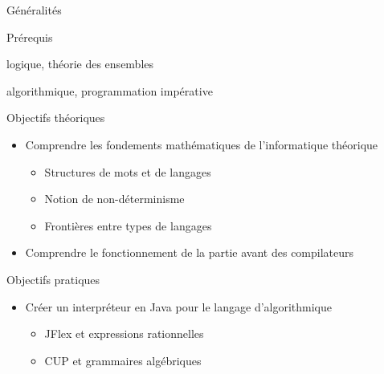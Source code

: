
\begingroup

\begin{frame}{Généralités}
  
  \vspace{-1mm}
  \begin{block}{Prérequis}
    \begin{description}[Mathématiques :]
    \item[Mathématiques :]\vspace{-1mm} logique, théorie des ensembles
    \item[Informatique :] algorithmique, programmation impérative 
    \end{description}
  \end{block}

  \vspace{-1mm}
  \begin{block}{Objectifs théoriques}
    \begin{itemize}
    \item Comprendre les fondements mathématiques de l'informatique théorique
      \begin{itemize}
      \item Structures de mots et de langages
      \item Notion de non-déterminisme
      \item Frontières entre types de langages
      \end{itemize}
    \item Comprendre le fonctionnement de la partie avant des compilateurs
    \end{itemize}
  \end{block}

  \vspace{-1mm}
  \begin{block}{Objectifs pratiques}
    \begin{itemize}
    \item Créer un interpréteur en Java pour le langage d'algorithmique 
      \begin{itemize}
      \item JFlex et expressions rationnelles
      \item CUP et grammaires algébriques
      \end{itemize}
    \end{itemize}
  \end{block}

\end{frame}

\endgroup
\endinput
